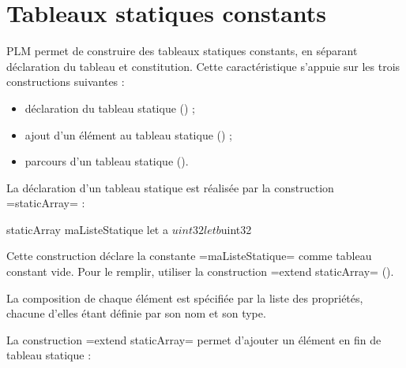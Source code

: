 




\chapter{Tableaux statiques constants}

PLM permet de construire des tableaux statiques constants, en séparant déclaration du tableau et constitution. Cette caractéristique s'appuie sur les trois constructions suivantes :
\begin{itemize}
  \item déclaration du tableau statique () ;
  \item ajout d'un élément au tableau statique () ;
  \item parcours d'un tableau statique ().
\end{itemize}












La déclaration d'un tableau statique est réalisée par la construction \plm=staticArray= :

\begin{PLM}
staticArray maListeStatique {
  let a $uint32
  let b $uint32
}
\end{PLM}

Cette construction déclare la constante \plm=maListeStatique= comme tableau constant vide. Pour le remplir, utiliser la construction \plm=extend staticArray= ().

La composition de chaque élément est spécifiée par la liste des propriétés, chacune d'elles étant définie par son nom et son type.










La construction \plm=extend staticArray= permet d'ajouter un élément en fin de tableau statique :

